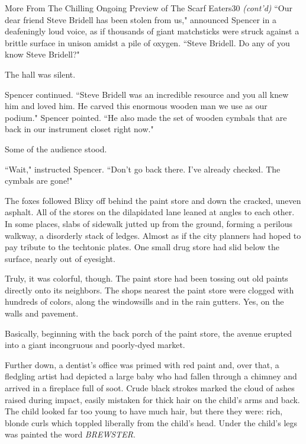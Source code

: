 \documentclass[10pt,twoside]{report}
\begin{document}
	\begin{sidebar}{More From The Chilling Ongoing Preview of The Scarf Eaters}{30}
		\textit{(cont'd)} ``Our dear friend Steve Bridell has been stolen from us," announced Spencer in a deafeningly loud voice, as if thousands of giant matchsticks were struck against a brittle surface in unison amidst a pile of oxygen. ``Steve Bridell. Do any of you know Steve Bridell?"\vspace{6pt}
		
		The hall was silent.\vspace{6pt}

		Spencer continued. ``Steve Bridell was an incredible resource and you all knew him and loved him. He carved this enormous wooden man we use as our podium." Spencer pointed. ``He also made the set of wooden cymbals that are back in our instrument closet right now."\vspace{6pt}

		Some of the audience stood.\vspace{6pt}

		``Wait," instructed Spencer. ``Don't go back there. I've already checked. The cymbals are gone!"
	\end{sidebar}

The foxes followed Blixy off behind the paint store and down the
cracked, uneven asphalt. All of the stores on the dilapidated lane
leaned at angles to each other.  In some places, slabs of sidewalk
jutted up from the ground, forming a perilous walkway, a disorderly
stack of ledges.  Almost as if the city planners had hoped to pay
tribute to the techtonic plates.  One small drug store had slid below
the surface, nearly out of eyesight.

Truly, it was colorful, though.  The paint store had been tossing out
old paints directly onto its neighbors.  The shops nearest the paint
store were clogged with hundreds of colors, along the windowsills and
in the rain gutters.  Yes, on the walls and pavement.

Basically, beginning with the back porch of the paint store, the
avenue erupted into a giant incongruous and poorly-dyed market.

Further down, a dentist's office was primed with red paint and, over
that, a fledgling artist had depicted a large baby who had fallen
through a chimney and arrived in a fireplace full of soot. Crude black
strokes marked the cloud of ashes raised during impact, easily
mistaken for thick hair on the child's arms and back.  The child
looked far too young to have much hair, but there they were: rich,
blonde curls which toppled liberally from the child's head.  Under the
child's legs was painted the word {\em BREWSTER}.
\end{document}
